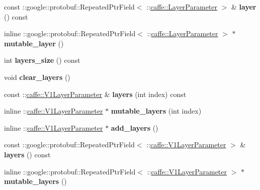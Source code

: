 \begin{DoxyCompactItemize}
\item 
\mbox{\label{classcaffe_1_1_net_parameter_a81205d9e3426f4e16714621e4d3d1731}} 
const \+::google\+::protobuf\+::\+Repeated\+Ptr\+Field$<$ \+::\mbox{\hyperlink{classcaffe_1_1_layer_parameter}{caffe\+::\+Layer\+Parameter}} $>$ \& {\bfseries layer} () const
\item 
\mbox{\label{classcaffe_1_1_net_parameter_a5bac0f8215feacee067361dd24b91ab4}} 
inline \+::google\+::protobuf\+::\+Repeated\+Ptr\+Field$<$ \+::\mbox{\hyperlink{classcaffe_1_1_layer_parameter}{caffe\+::\+Layer\+Parameter}} $>$ $\ast$ {\bfseries mutable\+\_\+layer} ()
\item 
\mbox{\label{classcaffe_1_1_net_parameter_a56f0dbb2e93369007190241c91e4b19c}} 
int {\bfseries layers\+\_\+size} () const
\item 
\mbox{\label{classcaffe_1_1_net_parameter_afda42a5c23fa298968abd46f86ac7aeb}} 
void {\bfseries clear\+\_\+layers} ()
\item 
\mbox{\label{classcaffe_1_1_net_parameter_a7deaf6e28e92b3a68c153daa0d700977}} 
const \+::\mbox{\hyperlink{classcaffe_1_1_v1_layer_parameter}{caffe\+::\+V1\+Layer\+Parameter}} \& {\bfseries layers} (int index) const
\item 
\mbox{\label{classcaffe_1_1_net_parameter_acc17d12a586bf174a1e123773dbb3044}} 
inline \+::\mbox{\hyperlink{classcaffe_1_1_v1_layer_parameter}{caffe\+::\+V1\+Layer\+Parameter}} $\ast$ {\bfseries mutable\+\_\+layers} (int index)
\item 
\mbox{\label{classcaffe_1_1_net_parameter_a53888093f7efd24961bfaa137214d11b}} 
inline \+::\mbox{\hyperlink{classcaffe_1_1_v1_layer_parameter}{caffe\+::\+V1\+Layer\+Parameter}} $\ast$ {\bfseries add\+\_\+layers} ()
\item 
\mbox{\label{classcaffe_1_1_net_parameter_a3d8a6a556d8da828cd7d1e0aa849509d}} 
const \+::google\+::protobuf\+::\+Repeated\+Ptr\+Field$<$ \+::\mbox{\hyperlink{classcaffe_1_1_v1_layer_parameter}{caffe\+::\+V1\+Layer\+Parameter}} $>$ \& {\bfseries layers} () const
\item 
\mbox{\label{classcaffe_1_1_net_parameter_ab7a9fdfc7e612905633f3d1c76c69952}} 
inline \+::google\+::protobuf\+::\+Repeated\+Ptr\+Field$<$ \+::\mbox{\hyperlink{classcaffe_1_1_v1_layer_parameter}{caffe\+::\+V1\+Layer\+Parameter}} $>$ $\ast$ {\bfseries mutable\+\_\+layers} ()
\end{DoxyCompactItemize}
